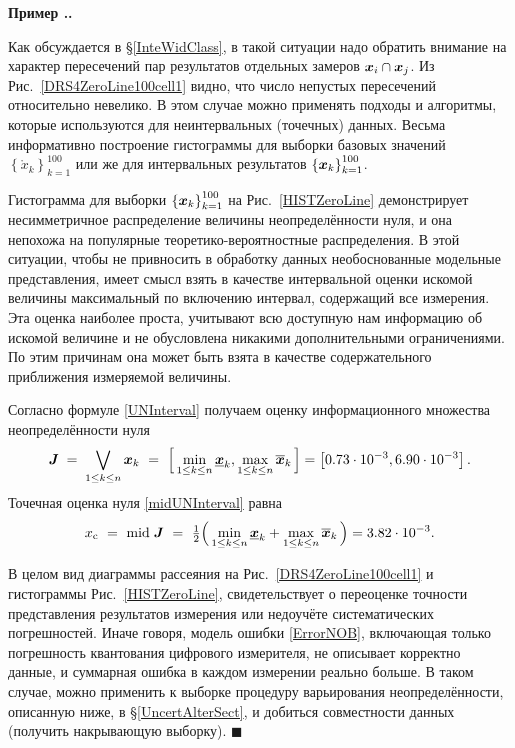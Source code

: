 \documentclass[a5paper,openany]{book}
\newcommand{\mbf}[1]{\protect\text{\boldmath$#1$}}
\newcommand{\ov}{\overline}
\newcommand{\un}{\underline}
\newcommand{\m}{\mathrm{mid}\;}
\newcounter{ExmpNum}[section]
\renewcommand{\theExmpNum}{\thesection.\arabic{ExmpNum}}
\newenvironment{example}%
  {\refstepcounter{ExmpNum}%
  \par\addvspace{\medskipamount} 
  \noindent\textbf{Пример {\theExmpNum}.}
  }%
  {\hfill$\blacksquare$\par\medskip}
\begin{document}
\begin{example}
Как обсуждается в \S\ref{InteWidClass}, в такой ситуации надо обратить 
внимание на  характер пересечений пар результатов отдельных замеров $ \mbf{x}_i \cap 
\mbf{x}_j$. Из Рис.~\ref{DRS4ZeroLine100cell1} видно, что число непустых пересечений 
относительно невелико. В этом случае можно применять подходы и алгоритмы, которые 
используются для неинтервальных (точечных) данных. Весьма информативно построение 
гистограммы для выборки базовых значений $\left\lbrace\mathring{x}_k 
\right\rbrace _{k=1}^{100}$ или же для интервальных результатов $\left\lbrace\mbf{x}_k 
\right\rbrace _{k=1}^{100}$. 

Гистограмма для выборки  $\left\lbrace \mbf{x}_k\right\rbrace _{k=1}^{100}$  
на Рис.~\ref{HISTZeroLine} демонстрирует несимметричное распределение величины 
неопределённости нуля, и она непохожа на популярные теоретико-вероятностные 
распределения. В этой ситуации, чтобы не привносить в обработку данных необоснованные 
модельные представления, имеет смысл взять в качестве интервальной оценки искомой 
величины максимальный по включению интервал, содержащий все измерения. Эта оценка 
наиболее проста, учитывают всю доступную нам информацию об искомой величине и 
не обусловлена никакими дополнительными ограничениями. По этим причинам она может 
быть взята в качестве содержательного приближения измеряемой величины. 
     
Согласно формуле \eqref{UNInterval} получаем оценку информационного множества 
неопределённости нуля 
\begin{equation*} 
\mbf{J}\; = \;\bigvee_{1\leq k\leq n} \mbf{x}_{k} \ 
  = \  \Bigl[\,\min_{1\leq k\leq n} \un{\mbf{x}}_{k}, 
\max_{1\leq k\leq n} \ov{\mbf{x}}_{k}\,\Bigr] 
  = \left[ 0.73 \cdot 10^{-3}, 6.90 \cdot 10^{-3} \right].
\end{equation*} 
Точечная оценка нуля \eqref{midUNInterval} равна 
\begin{equation*}
x_\text{c} \  = \  \m\mbf{J} \   
= \  \tfrac{1}{2} \Bigl(\,\min_{1\leq k\leq n} \un{\mbf{x}}_{k} + 
\max_{1\leq k\leq n} \ov{\mbf{x}}_{k}\,\Bigr) = 3.82 \cdot 10^{-3}. 
\end{equation*} 

В целом вид диаграммы рассеяния на Рис.~\ref{DRS4ZeroLine100cell1} и гистограммы 
Рис.~\ref{HISTZeroLine}, свидетельствует о переоценке точности представления 
результатов измерения или недоучёте систематических погрешностей. Иначе говоря, 
модель ошибки \eqref{ErrorNOB}, включающая только погрешность квантования цифрового 
измерителя, не описывает корректно данные, и суммарная ошибка в каждом измерении 
реально больше. В таком случае, можно применить к выборке процедуру варьирования 
неопределённости, описанную ниже, в \S\ref{UncertAlterSect}, и добиться совместности 
данных (получить накрывающую выборку). 
\end{example}
  
\end{document}
